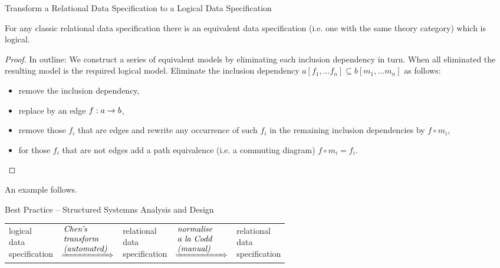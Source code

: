 \begin{frame}{Transform a Relational Data Specification to a Logical Data Specification}
\begin{lemma}
For any classic relational data specification 
there is an equivalent data specification
(i.e. one with the same theory category) which is logical.
\end{lemma}

\begin{proof}
In outline: We construct a series of equivalent models by eliminating each 
inclusion dependency in turn. When all eliminated the resulting model is the required logical model. Eliminate the inclusion dependency 
$a[f_1,...f_n] \subseteq b[m_1,...m_n]$
as follows:
\begin{itemize}
\item remove the inclusion dependency,
\item replace by an edge $f: a \rightarrow b$, 
\item remove those $f_i$ that are edges and 
rewrite any occurrence of such $f_i$ in the remaining inclusion dependencies by $f \circ  m_i$, 
\item for those $f_i$ that are not edges add a path equivalence (i.e. a commuting diagram)
$f \circ m_i = f_i$.
\end{itemize}
\end{proof}
An example follows.
\end{frame}






\newcommand{\transone}{\parbox{2cm}{\textit{Chen's \\transform \\(automated)}}}
\newcommand{\transtwo}{\parbox{2cm}{\textit{normalise \\ a la Codd \\(manual)}}}
\begin{frame}{Best Practice -- Structured Systemns Analysis and Design}

\begin{center}
\begin{tabular}{ p{1.25cm} p{2cm} p{1.25cm} p{2cm}  p{1.25cm}}
\parbox{3cm}{logical \\ data \\ specification}&  $\xRightarrow{\transone}$ & \parbox{3cm}{relational \\ data \\specification} & $ \xRightarrow{\transtwo} $ & \parbox{3.5cm}{relational \\data \\specification}
\end{tabular}
\end{center}
\end{frame}

